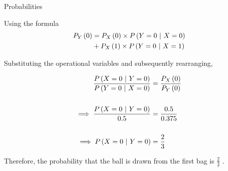 \documentclass[journal,12pt,twocolumn]{IEEEtran}
\begin{document}
	
	\begin{table}[h!b]
	
		\caption{Probabilities}
		
		
		\label{table}
		
	\end{table}
		
		
		
	
	Using the formula
	\begin{align}
		P_{Y}\left(0\right) &= P_{X}\left(0\right) \times P\left(Y = 0\ |\ X = 0\right) \nonumber \\
		&+ P_{X}\left(1\right) \times P\left(Y = 0\ |\ X = 1\right)
			\label{prob_form}
	\end{align}
	
	\newpage

	Substituting the operational variables and subsequently rearranging,
	
	
	\begin{align}
		\frac{P\left(X = 0\ |\ Y = 0\right)}{P\left(Y = 0\ |\ X = 0\right)} &= \frac{P_{X}\left(0\right)}{P_{Y}\left(0\right)} \\
		\nonumber \\
		\implies \frac{P\left(X = 0\ |\ Y = 0\right)}{0.5} &= \frac{0.5}{0.375} \\
		\nonumber \\
		\implies P\left(X = 0\ |\ Y = 0\right) &= \frac{2}{3}
			\label{soln}
	\end{align}
	
	Therefore, the probability that the ball is drawn from the first bag is $\underline{\frac{2}{3}}$ .
				
\end{document}

